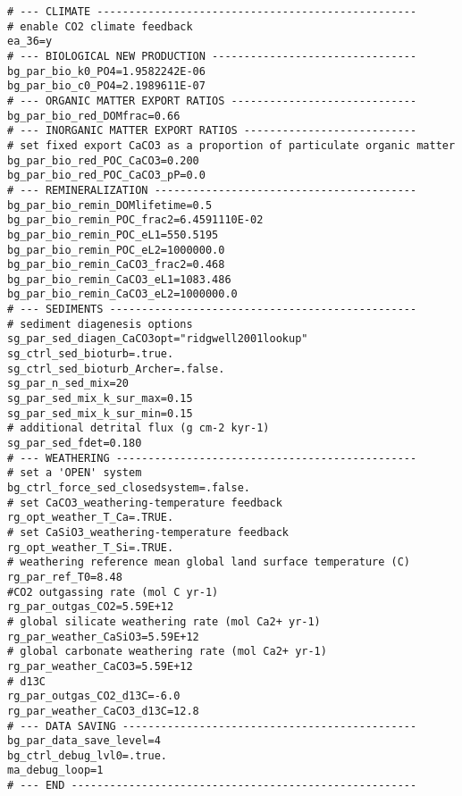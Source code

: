 \documentclass[11pt,fleqn]{book} %
\begin{document}
\scriptsize\begin{verbatim}
# --- CLIMATE --------------------------------------------------
# enable CO2 climate feedback
ea_36=y
# --- BIOLOGICAL NEW PRODUCTION --------------------------------
bg_par_bio_k0_PO4=1.9582242E-06
bg_par_bio_c0_PO4=2.1989611E-07
# --- ORGANIC MATTER EXPORT RATIOS -----------------------------
bg_par_bio_red_DOMfrac=0.66
# --- INORGANIC MATTER EXPORT RATIOS ---------------------------
# set fixed export CaCO3 as a proportion of particulate organic matter
bg_par_bio_red_POC_CaCO3=0.200
bg_par_bio_red_POC_CaCO3_pP=0.0
# --- REMINERALIZATION -----------------------------------------
bg_par_bio_remin_DOMlifetime=0.5
bg_par_bio_remin_POC_frac2=6.4591110E-02
bg_par_bio_remin_POC_eL1=550.5195
bg_par_bio_remin_POC_eL2=1000000.0
bg_par_bio_remin_CaCO3_frac2=0.468
bg_par_bio_remin_CaCO3_eL1=1083.486
bg_par_bio_remin_CaCO3_eL2=1000000.0
# --- SEDIMENTS ------------------------------------------------
# sediment diagenesis options
sg_par_sed_diagen_CaCO3opt="ridgwell2001lookup"
sg_ctrl_sed_bioturb=.true.
sg_ctrl_sed_bioturb_Archer=.false.
sg_par_n_sed_mix=20
sg_par_sed_mix_k_sur_max=0.15
sg_par_sed_mix_k_sur_min=0.15
# additional detrital flux (g cm-2 kyr-1)
sg_par_sed_fdet=0.180
# --- WEATHERING -----------------------------------------------
# set a 'OPEN' system
bg_ctrl_force_sed_closedsystem=.false.
# set CaCO3_weathering-temperature feedback
rg_opt_weather_T_Ca=.TRUE.
# set CaSiO3_weathering-temperature feedback
rg_opt_weather_T_Si=.TRUE.
# weathering reference mean global land surface temperature (C)
rg_par_ref_T0=8.48
#CO2 outgassing rate (mol C yr-1)
rg_par_outgas_CO2=5.59E+12
# global silicate weathering rate (mol Ca2+ yr-1)
rg_par_weather_CaSiO3=5.59E+12
# global carbonate weathering rate (mol Ca2+ yr-1)
rg_par_weather_CaCO3=5.59E+12
# d13C
rg_par_outgas_CO2_d13C=-6.0
rg_par_weather_CaCO3_d13C=12.8
# --- DATA SAVING ----------------------------------------------
bg_par_data_save_level=4
bg_ctrl_debug_lvl0=.true.
ma_debug_loop=1
# --- END ------------------------------------------------------
\end{verbatim}\normalsize
\end{document}
